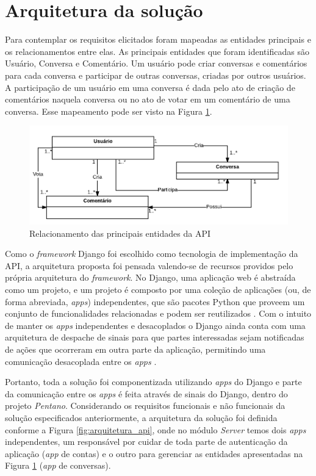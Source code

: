\section{Arquitetura da solução}

Para contemplar os requisitos elicitados foram mapeadas as entidades principais e os relacionamentos entre elas. 
As principais entidades que foram identificadas são Usuário, Conversa e Comentário. Um usuário pode criar
conversas e comentários para cada conversa e participar de outras conversas, criadas por outros usuários.
A participação de um usuário em uma conversa é dada pelo ato de criação de comentários naquela conversa ou
no ato de votar em um comentário de uma conversa. Esse mapeamento pode ser visto na Figura \ref{fig:entidades}.

\begin{figure}[h!]
\centering
\includegraphics[scale=0.5]{figuras/entidades.png}
\caption{Relacionamento das principais entidades da API}
\label{fig:entidades}
\end{figure}

Como o \textit{framework} Django foi escolhido como tecnologia de implementação da API, a arquitetura proposta foi pensada valendo-se de 
recursos providos pelo própria arquitetura do \textit{framework}.
No Django, uma aplicação web é abstraída como um projeto, e um projeto é composto por uma coleção de aplicações
(ou, de forma abreviada, \textit{apps}) independentes, que
são pacotes Python que proveem um conjunto de funcionalidades relacionadas e podem ser reutilizados \cite{django_apps}.
Com o intuito de manter os \textit{apps} independentes e desacoplados o Django ainda conta com uma arquitetura de despache
de sinais para que partes interessadas sejam notificadas de ações que ocorreram em outra parte da aplicação, permitindo uma comunicação
desacoplada entre os \textit{apps} \cite{django_signals}.

Portanto, toda a solução foi componentizada utilizando \textit{apps} do 
Django e parte da comunicação entre os \textit{apps} é feita através de sinais do Django, dentro do projeto \emph{Pentano}.
Considerando os requisitos funcionais e não funcionais da solução especificados anteriormente, a arquitetura da solução foi definida 
conforme a Figura \ref{fig:arquitetura_api}, onde no módulo \textit{Server} temos dois \textit{apps} independentes, um responsável
por cuidar de toda parte de autenticação da aplicação (\textit{app} de contas) e o outro para gerenciar as entidades apresentadas na
Figura \ref{fig:entidades} (\textit{app} de conversas).


